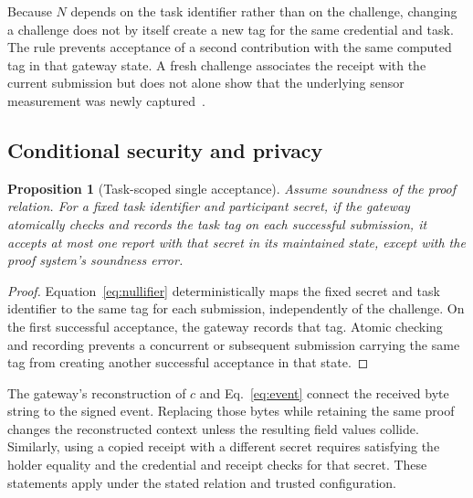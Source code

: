 \documentclass[pdflatex,iicol,sn-mathphys-num]{sn-jnl}
\newtheorem{proposition}{Proposition}
\begin{document}
Because $N$ depends on the task identifier rather than on the challenge, changing a challenge does not by itself create a new tag for the same credential and task. The rule prevents acceptance of a second contribution with the same computed tag in that gateway state. A fresh challenge associates the receipt with the current submission but does not alone show that the underlying sensor measurement was newly captured~\cite{Birkholz2023RATS}.

\subsection{Conditional security and privacy}
\label{sec:interpretation}

\begin{proposition}[Task-scoped single acceptance]
Assume soundness of the proof relation. For a fixed task identifier and participant secret, if the gateway atomically checks and records the task tag on each successful submission, it accepts at most one report with that secret in its maintained state, except with the proof system's soundness error.
\end{proposition}
\begin{proof}
Equation~\eqref{eq:nullifier} deterministically maps the fixed secret and task identifier to the same tag for each submission, independently of the challenge. On the first successful acceptance, the gateway records that tag. Atomic checking and recording prevents a concurrent or subsequent submission carrying the same tag from creating another successful acceptance in that state.
\end{proof}


The gateway's reconstruction of $c$ and Eq.~\eqref{eq:event} connect the received byte string to the signed event. Replacing those bytes while retaining the same proof changes the reconstructed context unless the resulting field values collide. Similarly, using a copied receipt with a different secret requires satisfying the holder equality and the credential and receipt checks for that secret. These statements apply under the stated relation and trusted configuration.
\end{document}
